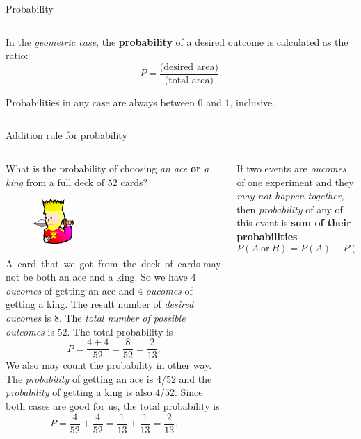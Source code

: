 \documentclass[9pt,aspectratio=169]{beamer}
\begin{document}
\begin{frame}{Probability}
\begin{columns}[T]
\begin{column}{0.5\textwidth}
      \begin{definition}
        In the \emph{geometric case}, the \textbf{probability} of a desired outcome is calculated as the ratio:
        \[ P = \frac{\text{(desired area)}}{\text{(total area)}}. \]
        \vspace*{-1.5ex}
      \end{definition}

      Probabilities in any case are always between $0$ and $1$, inclusive.
    \end{column}
  \end{columns}
\end{frame}

\begin{frame}{Addition rule for probability}
  \begin{columns}[T]
    \begin{column}{0.5\textwidth}
      \begin{problem}
        What is the probability of choosing \emph{an ace} \textbf{or} \emph{a king} from a full deck of $52$ cards?
      \end{problem}
      \begin{figure}%
        \vspace{-1em}
        \includegraphics[width=0.25\textwidth]{03 - Probability/king-clip-art.png}
      \end{figure}
      \mbox{A card that we got from the deck of cards} may not be both an ace and a king. So we have $4$ \emph{oucomes} of getting an ace and $4$ \emph{oucomes} of getting a king. The result number of \emph{desired oucomes} is $8$. The \emph{total number of possible outcomes} is $52$.
      The total probability is
      \[ P = \frac{4 + 4}{52} = \frac{8}{52} = \frac{2}{13}. \]
      We also may count the probability in other way. The \emph{probability} of getting an ace is $4/52$ and the \emph{probability} of getting a king is also $4/52$. Since both cases are good for us, the total probability is
      \[ P = \frac{4}{52} + \frac{4}{52} = \frac{1}{13} + \frac{1}{13} = \frac{2}{13}. \]
    \end{column}
    \begin{column}{0.5\textwidth}
      \begin{definition}
        If two events are \emph{oucomes} of one experiment and they \emph{may not happen together}, then \emph{probability} of any of this event is \textbf{sum of their probabilities}
        \[ P(A\ \text{or}\ B) = P(A) + P(B). \]
        \vspace*{-2.5ex}          
      \end{definition}


\end{column}
\end{columns}
\end{frame}
\end{document}
